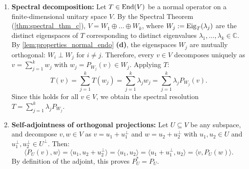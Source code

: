 \begin{exercisesolution}
\label{sol:spectral_decomposition_projections}
\begin{enumerate}[label=\textbf{(\alph*)}]
    \item \textbf{Spectral decomposition:}
    Let $T \in \operatorname{End}(V)$ be a normal operator on a finite-dimensional unitary space $V$.
    By the Spectral Theorem (\cref{thm:spectral_thm_c}), $V = W_1 \oplus \dots \oplus W_k$, where $W_j := \operatorname{Eig}_T(\lambda_j)$ are the distinct eigenspaces of $T$ corresponding to distinct eigenvalues $\lambda_1, \dots, \lambda_k \in \mathbb{C}$.
    By \cref{lem:properties_normal_endo} \textbf{(d)}, the eigenspaces $W_j$ are mutually orthogonal: $W_i \perp W_j$ for $i \ne j$.
    Therefore, every $v \in V$ decomposes uniquely as $v = \sum_{j=1}^k w_j$ with $w_j = P_{W_j}(v) \in W_j$.
    Applying $T$:
    \[
    T(v) = \sum_{j=1}^k T(w_j) = \sum_{j=1}^k \lambda_j w_j = \sum_{j=1}^k \lambda_j P_{W_j}(v).
    \]
    Since this holds for all $v \in V$, we obtain the spectral resolution $T = \sum_{j=1}^k \lambda_j P_{W_j}$.

    \item \textbf{Self-adjointness of orthogonal projections:}
    Let $U \subseteq V$ be any subspace, and decompose $v, w \in V$ as $v = u_1 + u_1^\perp$ and $w = u_2 + u_2^\perp$ with $u_1, u_2 \in U$ and $u_1^\perp, u_2^\perp \in U^\perp$.
    Then:
    \[
    \langle P_U(v), w \rangle = \langle u_1, u_2 + u_2^\perp \rangle = \langle u_1, u_2 \rangle = \langle u_1 + u_1^\perp, u_2 \rangle = \langle v, P_U(w) \rangle.
    \]
    By definition of the adjoint, this proves $P_U^* = P_U$. \qedhere
\end{enumerate}
\end{exercisesolution}

